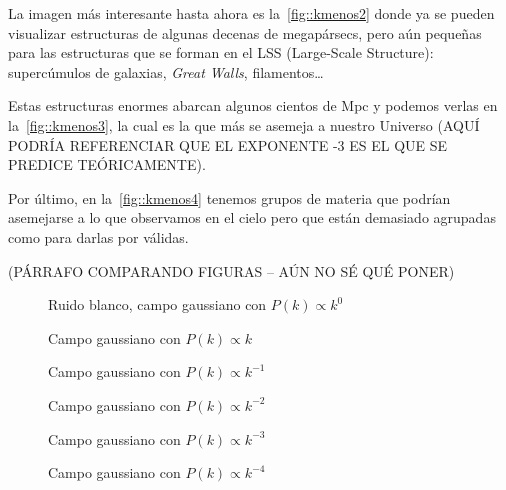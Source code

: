 La imagen más interesante hasta ahora es la~\autoref{fig::kmenos2} donde ya se pueden visualizar estructuras de algunas decenas de megapársecs, pero aún pequeñas para las estructuras que se forman en el LSS (Large-Scale Structure): supercúmulos de galaxias, \textit{Great Walls}, filamentos\dots

Estas estructuras enormes abarcan algunos cientos de Mpc y podemos verlas en la~\autoref{fig::kmenos3}, la cual es la que más se asemeja a nuestro Universo (AQUÍ PODRÍA REFERENCIAR QUE EL EXPONENTE -3 ES EL QUE SE PREDICE TEÓRICAMENTE).

Por último, en la~\autoref{fig::kmenos4} tenemos grupos de materia que podrían asemejarse a lo que observamos en el cielo pero que están demasiado agrupadas como para darlas por válidas.

(PÁRRAFO COMPARANDO FIGURAS -- AÚN NO SÉ QUÉ PONER)
\begin{figure}
  \centering
  {}
  \caption{Ruido blanco, campo gaussiano con \(P(k)\propto k^0\)}
  \label{fig::k0}
\end{figure}
\begin{figure}
  \centering
  {}
  \caption{Campo gaussiano con \(P(k)\propto k\)}
  \label{fig::k1}
\end{figure}
\begin{figure}
  \centering
  {}
  \caption{Campo gaussiano con \(P(k)\propto k^{-1}\)}
  \label{fig::kmenos1}
\end{figure}
\begin{figure}
  \centering
  {}
  \caption{Campo gaussiano con \(P(k)\propto k^{-2}\)}
  \label{fig::kmenos2}
\end{figure}
\begin{figure}
  \centering
  {}
  \caption{Campo gaussiano con \(P(k)\propto k^{-3}\)}
  \label{fig::kmenos3}
\end{figure}
\begin{figure}
  \centering
  {}
  \caption{Campo gaussiano con \(P(k)\propto k^{-4}\)}
  \label{fig::kmenos4}
\end{figure}
